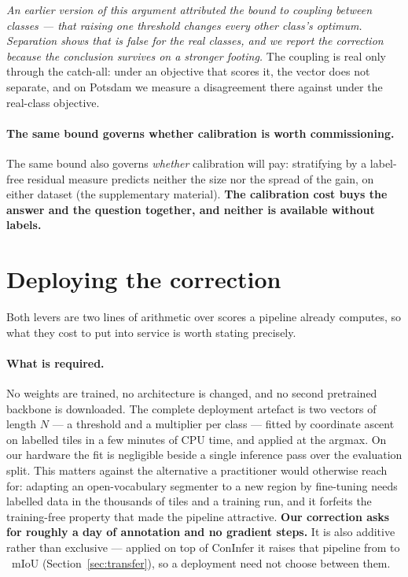 \documentclass[10pt,a4paper]{article}                        %
\newcommand{\best}[1]{\textbf{#1}}
\newcommand{\suppref}[1]{the supplementary material}
\begin{document}
\emph{An earlier version of this argument attributed the bound to coupling
between classes --- that raising one threshold changes every other class's
optimum. Separation shows that is false for the real classes, and we report the
correction because the conclusion survives on a stronger footing.} The coupling is
real only through the catch-all: under an objective that scores it, the vector does
not separate, and on Potsdam we measure a \sepAllMax{} disagreement there against
\sepExact{} under the real-class objective.

\paragraph{The same bound governs whether calibration is worth commissioning.} The same bound also governs \emph{whether} calibration will pay: stratifying by a label-free residual measure predicts neither the size nor the spread of the gain, on either dataset (\suppref{sup:when}). \best{The calibration cost buys the answer and the question together, and neither is available without labels.}

\section{Deploying the correction}
\label{sec:deploy}

Both levers are two lines of arithmetic over scores a pipeline already computes,
so what they cost to put into service is worth stating precisely.

\paragraph{What is required.} No weights are trained, no architecture is changed,
and no second pretrained backbone is downloaded. The complete deployment artefact
is two vectors of length $N$ --- a threshold and a multiplier per class --- fitted
by coordinate ascent on \calibTiles{} labelled tiles in a few minutes of CPU time,
and applied at the argmax. On our hardware the fit is negligible beside a single
inference pass over the evaluation split. This matters against the alternative a
practitioner would otherwise reach for: adapting an open-vocabulary segmenter to a
new region by fine-tuning needs labelled data in the thousands of tiles and a
training run, and it forfeits the training-free property that made the pipeline
attractive. \best{Our correction asks for roughly a day of annotation and no
gradient steps.} It is also additive rather than exclusive --- applied on top of
ConInfer it raises that pipeline from \cnRepro{} to \cnFit{}~mIoU
(Section~\ref{sec:transfer}), so a deployment need not choose between them.
\end{document}

